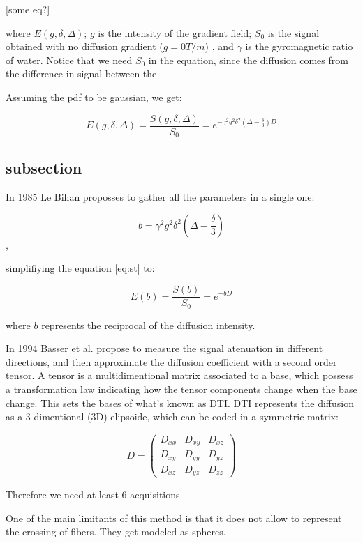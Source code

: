 [some eq?]

where $E(g, \delta, \Delta)$;
$g$ is the intensity of the gradient field;
$S_0$ is the signal obtained with no diffusion gradient ($g=0 T/m$)
, and $\gamma$ is the gyromagnetic ratio of water.
Notice that we need $S_0$ in the equation, since the diffusion comes from the difference in signal between the 

Assuming the pdf to be gaussian, we get:

\begin{equation}
    E(g, \delta, \Delta) = 
    \frac{S(g, \delta, \Delta)}{S_0} =
         e^{-\gamma^2 g^2 \delta^2 \left(\Delta - \frac{\delta}{3}\right) D} 
    \label{eq:st}
\end{equation}

\subsection{subsection}
In 1985 Le Bihan \cite{LEBIHAN} proposses to gather all the parameters in a single one: 

$$ b = \gamma^2 g^2 \delta^2 \left(\Delta - \frac{\delta}{3}\right) $$ ,

simplifiying the equation \ref{eq:st} to:

$$ E(b) = \frac{S(b)}{S_0} = e^{-b D} $$

where $b$ represents the reciprocal of the diffusion intensity.

In 1994 Basser et al. \cite{Basser1994} propose to measure the signal atenuation in different directions, and then approximate the diffusion coefficient with a second order tensor.
A tensor is a multidimentional matrix associated to a base, which possess a transformation law indicating how the tensor components change when the base change.
This sets the bases of what's known as DTI.
DTI represents the diffusion as a 3-dimentional (3D) elipsoide, which can be coded in a symmetric matrix:

$$
    D =
    \begin{pmatrix}
             D_{xx} & D_{xy} & D_{xz} \\
             D_{xy} & D_{yy} & D_{yz} \\
             D_{xz} & D_{yz} & D_{zz}    
    \end{pmatrix}
$$

Therefore we need at least 6 acquisitions.

One of the main limitants of this method is that it does not allow to
represent the crossing of fibers. They get modeled as spheres.


